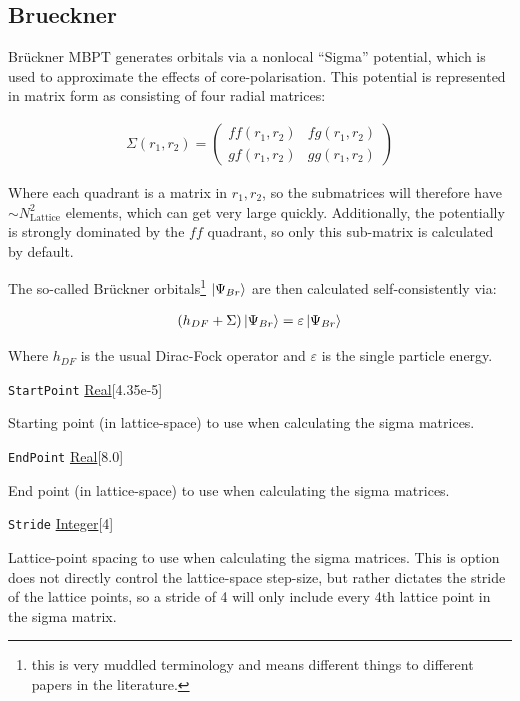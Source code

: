 \documentclass{report}
\begin{document}
\subsection{Brueckner}

Br\"{u}ckner MBPT generates orbitals via a nonlocal ``Sigma'' potential, which is used to approximate
the effects of core-polarisation. This potential is represented in matrix 
form as consisting of four radial matrices:

\begin{align}
\Sigma(r_1, r_2) = 
\begin{pmatrix}
ff(r_1, r_2)    & fg(r_1, r_2)\\
gf(r_1, r_2)    & gg(r_1, r_2)
\end{pmatrix}
\end{align}

Where each quadrant is a matrix in $r_1, r_2$, so the submatrices will therefore have $\sim
N_{\mathrm{Lattice}}^2$ elements, which can get very large quickly. Additionally, the potentially is
strongly dominated by the $ff$ quadrant, so only this sub-matrix is calculated by default.

The so-called Br\"{u}ckner orbitals\footnote{this is very muddled terminology and 
means different things to different papers in the literature. } $\ket{\Psi_{Br}}$ are then calculated 
self-consistently via:

\begin{align}
\label{eq:brueckner}
(h_{DF} + \Sigma) \ket{\Psi_{Br}} = \varepsilon \ket{\Psi_{Br}}
\end{align}

Where $h_{DF}$ is the usual Dirac-Fock operator and $\varepsilon$ is the single particle energy.

\texttt{StartPoint} \uline{Real}[4.35e-5]
\begin{adjustwidth}{1cm}{}
Starting point (in lattice-space) to use when calculating the sigma matrices.
\end{adjustwidth}

\texttt{EndPoint} \uline{Real}[8.0]
\begin{adjustwidth}{1cm}{}
End point (in lattice-space) to use when calculating the sigma matrices.
\end{adjustwidth}

\texttt{Stride} \uline{Integer}[4]
\begin{adjustwidth}{1cm}{}
Lattice-point spacing to use when calculating the sigma matrices. This is option does not directly
control the lattice-space step-size, but rather dictates the stride of the lattice points, so a stride
of 4 will only include every 4th lattice point in the sigma matrix.
\end{adjustwidth}
\end{document}
